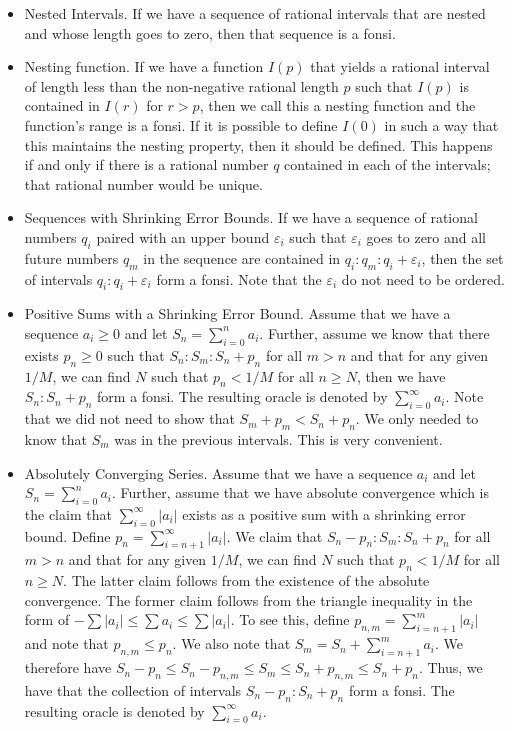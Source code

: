 \documentclass[12pt]{article}
\theoremstyle{remark}
\begin{document}
\begin{itemize}
    \item Nested Intervals. If we have a sequence of rational intervals that are nested and whose length goes to zero, then that sequence is a fonsi.
    \item Nesting function. If we have a function $I(p)$ that yields a rational interval of length less than the non-negative rational length $p$ such that $I(p)$ is contained in $I(r)$ for $r>p$, then we call this a nesting function and the function's range is a fonsi. If it is possible to define $I(0)$ in such a way that this maintains the nesting property, then it should be defined. This happens if and only if there is a rational number $q$ contained in each of the intervals; that rational number would be unique. 
    \item Sequences with Shrinking Error Bounds. If we have a sequence of rational numbers $q_i$ paired with an upper bound $\varepsilon_i$ such that $\varepsilon_i$ goes to zero and all future numbers $q_m$ in the sequence are contained in $q_i:q_m:q_i+\varepsilon_i$, then the set of intervals $q_i:q_i+\varepsilon_i$ form a fonsi. Note that the $\varepsilon_i$ do not need to be ordered. 
    \item Positive Sums with a Shrinking Error Bound. Assume that we have a sequence $a_i\geq 0$ and let $S_n = \sum_{i=0}^n a_i$. Further, assume we know that there exists $p_n \geq 0$ such that $S_n: S_m : S_n + p_n$ for all $m > n$ and that for any given $1/M$, we can find $N$ such that $p_n < 1/M$ for all $n \geq N$, then we have $S_n: S_n + p_n$ form a fonsi. The resulting oracle is denoted by $\sum_{i=0}^\infty a_i$. Note that we did not need to show that $S_m+p_m < S_n + p_n$. We only needed to know that $S_m$ was in the previous intervals. This is very convenient.
    \item Absolutely Converging Series. Assume that we have a sequence $a_i$ and let $S_n = \sum_{i=0}^n a_i$. Further, assume that we have absolute convergence which is the claim that $\sum_{i=0}^\infty |a_i|$ exists as a positive sum  with a shrinking error bound. Define $p_n = \sum_{i=n+1}^\infty |a_i|$. We claim that $S_n-p_n: S_m : S_n + p_n$ for all $m > n$ and that for any given $1/M$, we can find $N$ such that $p_n < 1/M$ for all $n \geq N$. The latter claim follows from the existence of the absolute convergence. The former claim follows from the triangle inequality in the form of $- \sum |a_i| \leq \sum a_i \leq \sum |a_i| $. To see this, define $p_{n,m} = \sum_{i=n+1}^m |a_i|$ and note that $p_{n,m} \leq  p_n$. We also note that $S_m = S_n + \sum_{i=n+1}^m a_i$.  We therefore have  $S_n - p_n \leq S_n - p_{n,m} \leq S_m \leq S_n+ p_{n,m} \leq S_n + p_n$. Thus, we have that the collection of intervals $S_n-p_n: S_n + p_n$ form a fonsi. The resulting oracle is denoted by $\sum_{i=0}^\infty a_i$.
\end{itemize}
\end{document}
